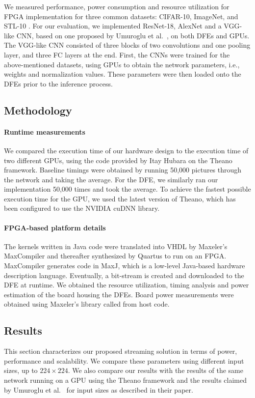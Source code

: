 \documentclass[conference]{IEEEtran}
\begin{document}
	
	We measured performance, power consumption and resource utilization for FPGA implementation for three common datasets: CIFAR-10\cite{krizhevsky2009learning}, ImageNet\cite{ILSVRC15}, and STL-10 \cite{coates2011analysis}. For our evaluation, we implemented ResNet-18, AlexNet and a VGG-like CNN, based on one proposed by Umuroglu et al.\ \cite{Umuroglu:2017:FFF:3020078.3021744}, on both DFEs and GPUs. The VGG-like CNN consisted of three blocks of two convolutions and one pooling layer, and three FC layers at the end. First, the CNNs were trained for the above-mentioned datasets, using GPUs to obtain the network parameters, i.e., weights and normalization values. These parameters were then loaded onto the DFEs prior to the inference process. 
	\subsection{Methodology}\label{perf_eval}
	\paragraph*{Runtime measurements} 
	We compared the execution time of our hardware design to the execution time of two different GPUs, using the code provided by Itay Hubara on the Theano framework. Baseline timings were obtained by running 50,000 pictures through the network and taking the average. For the DFE, we similarly ran our implementation 50,000 times and took the average.
	To achieve the fastest possible execution time for the GPU, we used the latest version of Theano, which has been configured to use the NVIDIA cuDNN library. 
	\paragraph*{FPGA-based platform details}
	The kernels written in Java code were translated into VHDL by Maxeler's MaxCompiler and thereafter synthesized by Quartus to run on an FPGA. MaxCompiler generates code in MaxJ, which is a low-level Java-based hardware description language. Eventually, a bit-stream is created and downloaded to the DFE at runtime. We obtained the resource utilization, timing analysis and power estimation of the board housing the DFEs. Board power measurements were obtained using Maxeler's library called from host code. 
	
	
	\subsection {Results}
	\label{results}
	This section characterizes our proposed streaming solution in terms of power, performance and scalability. We compare these parameters using different input sizes, up to $224\times224$. We also compare our results with the results of the same network running on a GPU using the Theano framework and the results claimed by Umuroglu et al.\ \cite{Umuroglu:2017:FFF:3020078.3021744} for input sizes as described in their paper. 
	
\end{document}
